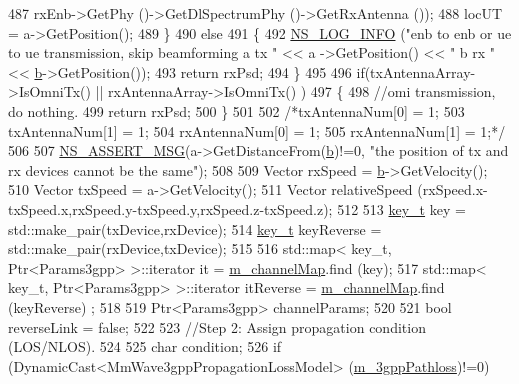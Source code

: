 \begin{DoxyCode}
487                                         rxEnb->GetPhy ()->GetDlSpectrumPhy ()->GetRxAntenna ());
488                 locUT = a->GetPosition();
489         \}
490         \textcolor{keywordflow}{else}
491         \{
492                 \hyperlink{group__logging_gafbd73ee2cf9f26b319f49086d8e860fb}{NS\_LOG\_INFO} (\textcolor{stringliteral}{"enb to enb or ue to ue transmission, skip beamforming a tx "} << a
      ->GetPosition() << \textcolor{stringliteral}{" b rx "} << \hyperlink{buildings__pathloss_8m_a21ad0bd836b90d08f4cf640b4c298e7c}{b}->GetPosition());
493                 \textcolor{keywordflow}{return} rxPsd;
494         \}
495 
496         \textcolor{keywordflow}{if}(txAntennaArray->IsOmniTx() || rxAntennaArray->IsOmniTx() )
497         \{
498                 \textcolor{comment}{//omi transmission, do nothing.}
499                 \textcolor{keywordflow}{return} rxPsd;
500         \}
501 
502         \textcolor{comment}{/*txAntennaNum[0] = 1;}
503 \textcolor{comment}{        txAntennaNum[1] = 1;}
504 \textcolor{comment}{        rxAntennaNum[0] = 1;}
505 \textcolor{comment}{        rxAntennaNum[1] = 1;*/}
506 
507         \hyperlink{assert_8h_aff5ece9066c74e681e74999856f08539}{NS\_ASSERT\_MSG}(a->GetDistanceFrom(\hyperlink{buildings__pathloss_8m_a21ad0bd836b90d08f4cf640b4c298e7c}{b})!=0, \textcolor{stringliteral}{"the position of tx and rx devices cannot be
       the same"});
508 
509         Vector rxSpeed = \hyperlink{buildings__pathloss_8m_a21ad0bd836b90d08f4cf640b4c298e7c}{b}->GetVelocity();
510         Vector txSpeed = a->GetVelocity();
511         Vector relativeSpeed (rxSpeed.x-txSpeed.x,rxSpeed.y-txSpeed.y,rxSpeed.z-txSpeed.z);
512 
513         \hyperlink{namespacens3_aa42bd408e172586b3b192acfaa36b070}{key\_t} key = std::make\_pair(txDevice,rxDevice);
514         \hyperlink{namespacens3_aa42bd408e172586b3b192acfaa36b070}{key\_t} keyReverse = std::make\_pair(rxDevice,txDevice);
515 
516         std::map< key\_t, Ptr<Params3gpp> >::iterator it = \hyperlink{classns3_1_1MmWave3gppChannel_a31f05f0c8a438b8ce89f29813e863040}{m\_channelMap}.find (key);
517         std::map< key\_t, Ptr<Params3gpp> >::iterator itReverse = \hyperlink{classns3_1_1MmWave3gppChannel_a31f05f0c8a438b8ce89f29813e863040}{m\_channelMap}.find (keyReverse)
      ;
518 
519         Ptr<Params3gpp> channelParams;
520 
521         \textcolor{keywordtype}{bool} reverseLink = \textcolor{keyword}{false};
522 
523         \textcolor{comment}{//Step 2: Assign propagation condition (LOS/NLOS).}
524 
525         \textcolor{keywordtype}{char} condition;
526         \textcolor{keywordflow}{if} (DynamicCast<MmWave3gppPropagationLossModel> (\hyperlink{classns3_1_1MmWave3gppChannel_add8860051acacb1819be2f7321dbd726}{m\_3gppPathloss})!=0)

\end{DoxyCode}
